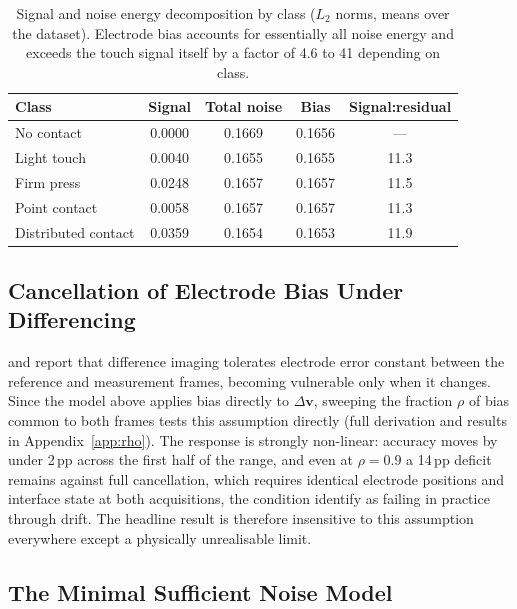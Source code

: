 \begin{table}[htbp]
\centering
\caption[Signal and noise energy decomposition by class]{Signal and noise energy decomposition by class ($L_2$ norms, means over the dataset). Electrode bias accounts for essentially all noise energy and exceeds the touch signal itself by a factor of 4.6 to 41 depending on class.}
\label{tab:noise-decomposition}
\small
\setlength{\tabcolsep}{6pt}
\begin{tabular}{@{}lcccc@{}}
\toprule
\textbf{Class} & \textbf{Signal} & \textbf{Total noise} & \textbf{Bias} & \textbf{Signal:residual} \\
\midrule
No contact          & 0.0000 & 0.1669 & 0.1656 & --- \\
Light touch         & 0.0040 & 0.1655 & 0.1655 & 11.3 \\
Firm press          & 0.0248 & 0.1657 & 0.1657 & 11.5 \\
Point contact       & 0.0058 & 0.1657 & 0.1657 & 11.3 \\
Distributed contact & 0.0359 & 0.1654 & 0.1653 & 11.9 \\
\bottomrule
\end{tabular}
\end{table}

\subsection{Cancellation of Electrode Bias Under Differencing}
\label{sec:res-rho}

\textcite{kolehmainen1997} and \textcite{boone1996} report that difference imaging tolerates electrode error constant between the reference and measurement frames, becoming vulnerable only when it changes. Since the model above applies bias directly to $\Delta\mathbf{v}$, sweeping the fraction $\rho$ of bias common to both frames tests this assumption directly (full derivation and results in Appendix~\ref{app:rho}). The response is strongly non-linear: accuracy moves by under 2\,pp across the first half of the range, and even at $\rho = 0.9$ a 14\,pp deficit remains against full cancellation, which requires identical electrode positions and interface state at both acquisitions, the condition \textcite{boone1996} identify as failing in practice through drift. The headline result is therefore insensitive to this assumption everywhere except a physically unrealisable limit.

\subsection{The Minimal Sufficient Noise Model}
\label{sec:res-ablation-minimal}

